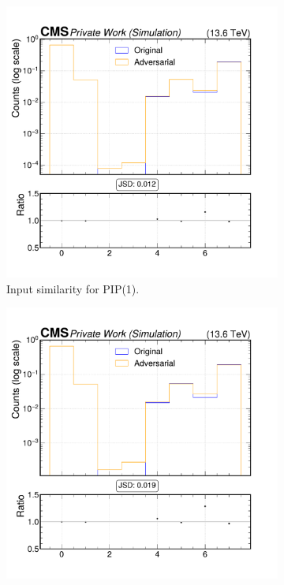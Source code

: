 \begin{figure}[h]
  \centering
  \begin{subfigure}[t]{0.32\textwidth}
    \includegraphics[width=\linewidth]{media/output/features/compare/intprob_1/cmp_cpf_arr_Cpfcan_VTX_ass.pdf}
    \caption{Input similarity for PIP(1).}
  \end{subfigure}\hfill
  \begin{subfigure}[t]{0.32\textwidth}
    \includegraphics[width=\linewidth]{media/output/features/compare/intprob_2/cmp_cpf_arr_Cpfcan_VTX_ass.pdf}

\end{subfigure}
\end{figure}
